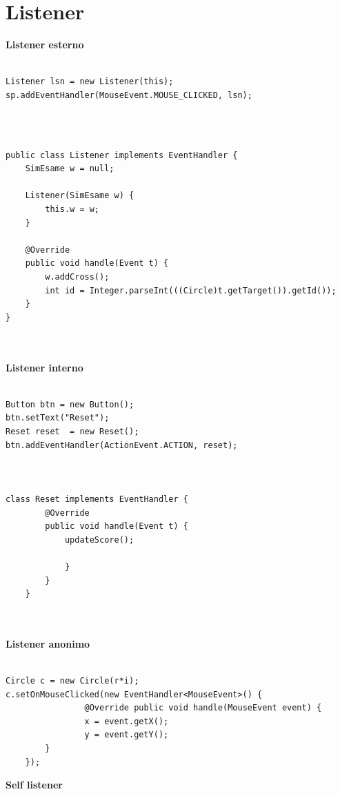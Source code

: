 \documentclass[10pt,a4paper]{book}
\begin{document}
\section{Listener}
\textbf{Listener esterno}\\\\
\begin{verbatim}
Listener lsn = new Listener(this);
sp.addEventHandler(MouseEvent.MOUSE_CLICKED, lsn);

\end{verbatim}
\\\\
\begin{verbatim}
public class Listener implements EventHandler {
    SimEsame w = null;
     
    Listener(SimEsame w) {
        this.w = w;
    }
    
    @Override
    public void handle(Event t) {
        w.addCross();
        int id = Integer.parseInt(((Circle)t.getTarget()).getId());
    }
}

\end{verbatim}
\\\\
\textbf{Listener interno}\\\\
\begin{verbatim}
Button btn = new Button();
btn.setText("Reset");
Reset reset  = new Reset();
btn.addEventHandler(ActionEvent.ACTION, reset);



class Reset implements EventHandler {
        @Override
        public void handle(Event t) {
            updateScore();
                
            }
        }
    }

\end{verbatim}
\\\\
\textbf{Listener anonimo}\\\\
\begin{verbatim}
Circle c = new Circle(r*i);
c.setOnMouseClicked(new EventHandler<MouseEvent>() {
                @Override public void handle(MouseEvent event) {
                x = event.getX();
                y = event.getY();
        }
    });

\end{verbatim}
\newpage
\textbf{Self listener}\\\\
\end{document}
